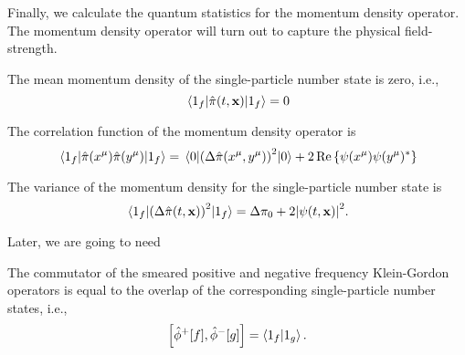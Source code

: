 Finally, we calculate the quantum statistics for the momentum density operator.
The momentum density operator will turn out to capture the physical field-strength.
\begin{lemma}\label{thm:single_particle_number_state_momentum_density_mean}
	The mean momentum density of the single-particle number state is zero, i.e.,
	\begin{equation}
		\expval{\hat\pi(t,\vb{x})}{1_f}
		=
		0
	\end{equation}
\end{lemma}
\begin{lemma}\label{thm:single_particle_number_state_momentum_density_correlation}
	The correlation function of the momentum density operator is
	\begin{equation}
		\expval{\hat\pi(x^\mu)\hat\pi(y^\mu)}{1_f}
		=
		\expval{\left(\Delta\hat\pi(x^\mu,y^\mu)\right)^2}{0}
		+
		2\operatorname{\operatorname{Re}}\left\{
			\psi(x^\mu)
			\psi(y^\mu)^*
		\right\}
	\end{equation}
\end{lemma}
\begin{corollary}
	The variance of the momentum density for the single-particle number state is
	\begin{equation}
		\expval{\left(\Delta\hat\pi(t,\vb{x})\right)^2}{1_f}
		=
		\Delta\pi_0
		+
		2
		\abs{\psi(t,\vb{x})}^2
		.
	\end{equation}
\end{corollary}
Later, we are going to need
\begin{lemma}\label{thm:single_partiicle_number_state_inner_product_pn_smeared_kg_comm}
	The commutator of the smeared positive and negative frequency Klein-Gordon operators is equal to the overlap of the corresponding single-particle number states, i.e.,
	\begin{equation}
		\comm{\hat\phi^+[f]}{\hat\phi^-[g]}
		=
		\braket{1_f}{1_g}
		.
	\end{equation}
\end{lemma}

